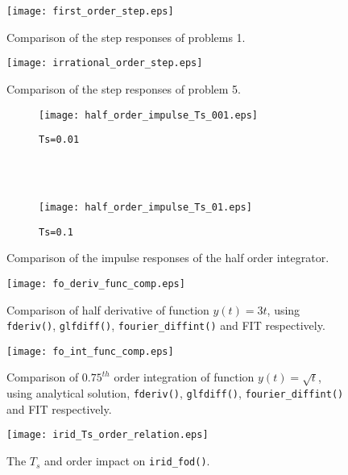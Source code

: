\documentclass[11pt]{tCON2e}
\theoremstyle{plain}\newtheorem{theorem}{Theorem}
\theoremstyle{definition}
\theoremstyle{remark}
\begin{document}
\begin{figure}[h]
\centering
\texttt{[image: first\_order\_step.eps]}
\caption{Comparison of the step responses of problems 1.}
\label{fig:first_order_step}
\end{figure}

\begin{figure}[h]
\centering
\texttt{[image: irrational\_order\_step.eps]}
\caption{Comparison of the step responses of problem 5.}
\label{fig:irrational_order_step}
\end{figure}



\begin{figure}[h]
\centering
    \begin{subfigure}[b]{0.75\textwidth}
        \texttt{[image: half\_order\_impulse\_Ts\_001.eps]}
        \caption{{\tt Ts=0.01}}
        \label{fig:half_order_impulse_Ts_0.01}
    \end{subfigure}\\~~ \begin{subfigure}[b]{0.75\textwidth}
        \texttt{[image: half\_order\_impulse\_Ts\_01.eps]}
        \caption{{\tt Ts=0.1}}
        \label{fig:half_order_impulse_Ts_0.1}
    \end{subfigure}\caption{Comparison of the impulse responses of the half order integrator.}
    \label{fig:half_order_impulse}
\end{figure}

\begin{figure}[h]
\centering
\texttt{[image: fo\_deriv\_func\_comp.eps]}
\caption[Comparison of half derivative of function $y(t) = 3t$]{Comparison of half derivative of function $y(t) = 3t$, using {\tt fderiv()}, {\tt glfdiff()}, {\tt fourier\_diffint()} and FIT respectively.}
\label{fig:fo_deriv_func_comp}
\end{figure}

\begin{figure}[h]
\centering
\texttt{[image: fo\_int\_func\_comp.eps]}
\caption[Comparison of $0.75^{th}$ order integral of function $y(t) = \sqrt{t}$]{Comparison of $0.75^{th}$ order integration of function $y(t) = \sqrt{t}$, using analytical solution, {\tt fderiv()}, {\tt glfdiff()}, {\tt fourier\_diffint()} and FIT respectively.}
\label{fig:fo_int_func_comp}
\end{figure}

\begin{figure}[h]
\centering
\texttt{[image: irid\_Ts\_order\_relation.eps]}
\caption{The $T_s$ and order impact on {\tt irid\_fod()}.}
\label{fig:irid_Ts_order_relation}
\end{figure}
\end{document}
